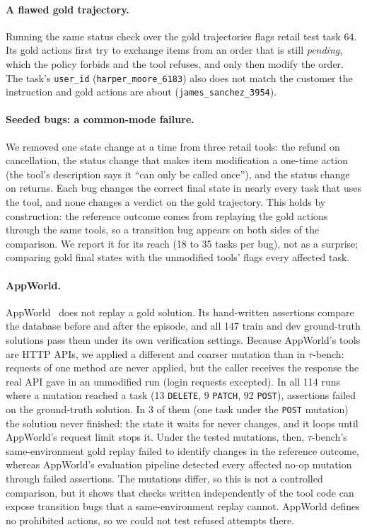 \documentclass[11pt,a4paper]{article}
\begin{document}
\paragraph{A flawed gold trajectory.} Running the same status check over the gold trajectories flags retail test task 64. Its gold actions first try to exchange items from an order that is still \emph{pending}, which the policy forbids and the tool refuses, and only then modify the order. The task's \texttt{user\_id} (\texttt{harper\_moore\_6183}) also does not match the customer the instruction and gold actions are about (\texttt{james\_sanchez\_3954}).

\paragraph{Seeded bugs: a common-mode failure.} We removed one state change at a time from three retail tools: the refund on cancellation, the status change that makes item modification a one-time action (the tool's description says it ``can only be called once''), and the status change on returns. Each bug changes the correct final state in nearly every task that uses the tool, and none changes a verdict on the gold trajectory. This holds by construction: the reference outcome comes from replaying the gold actions through the same tools, so a transition bug appears on both sides of the comparison. We report it for its reach (18 to 35 tasks per bug), not as a surprise; comparing gold final states with the unmodified tools' flags every affected task.

\paragraph{AppWorld.} AppWorld~\citep{trivedi2024appworld} does not replay a gold solution. Its hand-written assertions compare the database before and after the episode, and all 147 train and dev ground-truth solutions pass them under its own verification settings. Because AppWorld's tools are HTTP APIs, we applied a different and coarser mutation than in $\tau$-bench: requests of one method are never applied, but the caller receives the response the real API gave in an unmodified run (login requests excepted). In all 114 runs where a mutation reached a task (13 \texttt{DELETE}, 9 \texttt{PATCH}, 92 \texttt{POST}), assertions failed on the ground-truth solution. In 3 of them (one task under the \texttt{POST} mutation) the solution never finished: the state it waits for never changes, and it loops until AppWorld's request limit stops it. Under the tested mutations, then, $\tau$-bench's same-environment gold replay failed to identify changes in the reference outcome, whereas AppWorld's evaluation pipeline detected every affected no-op mutation through failed assertions. The mutations differ, so this is not a controlled comparison, but it shows that checks written independently of the tool code can expose transition bugs that a same-environment replay cannot. AppWorld defines no prohibited actions, so we could not test refused attempts there.
\end{document}
